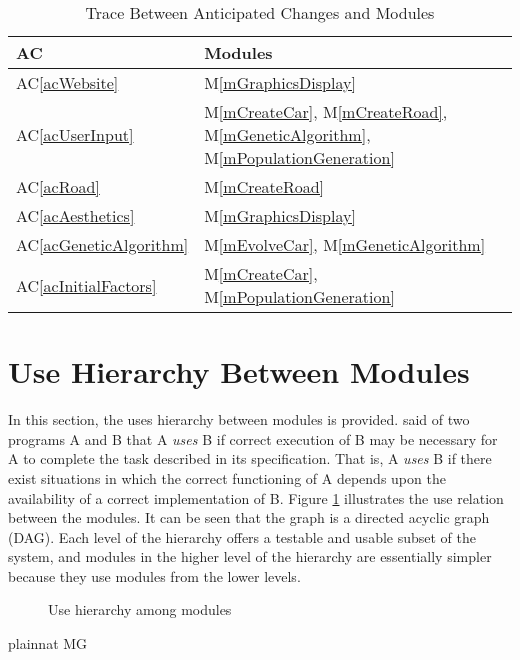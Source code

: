 \documentclass[12pt, titlepage]{article}
\newcommand{\acref}[1]{AC\ref{#1}}
\newcommand{\mref}[1]{M\ref{#1}}
\begin{document}
\begin{table}[H]
\centering
\begin{tabular}{p{} p{}}
\toprule
\textbf{AC} & \textbf{Modules}\\
\midrule
\acref{acWebsite} & \mref{mGraphicsDisplay}\\
\acref{acUserInput} & \mref{mCreateCar}, \mref{mCreateRoad}, \mref{mGeneticAlgorithm}, \mref{mPopulationGeneration}\\
\acref{acRoad} & \mref{mCreateRoad}\\
\acref{acAesthetics} & \mref{mGraphicsDisplay}\\
\acref{acGeneticAlgorithm} & \mref{mEvolveCar}, \mref{mGeneticAlgorithm}\\
\acref{acInitialFactors} & \mref{mCreateCar}, \mref{mPopulationGeneration}\\
\bottomrule
\end{tabular}
\caption{Trace Between Anticipated Changes and Modules}
\label{TblACT}
\end{table}

\section{Use Hierarchy Between Modules} \label{SecUse}

In this section, the uses hierarchy between modules is
provided. \citet{Parnas1978} said of two programs A and B that A {\em uses} B if
correct execution of B may be necessary for A to complete the task described in
its specification. That is, A {\em uses} B if there exist situations in which
the correct functioning of A depends upon the availability of a correct
implementation of B.  Figure \ref{FigUH} illustrates the use relation between
the modules. It can be seen that the graph is a directed acyclic graph
(DAG). Each level of the hierarchy offers a testable and usable subset of the
system, and modules in the higher level of the hierarchy are essentially simpler
because they use modules from the lower levels.

\begin{figure}[H]
\centering
\caption{Use hierarchy among modules}
\label{FigUH}
\end{figure}


 {plainnat}
 {MG}
\end{document}
